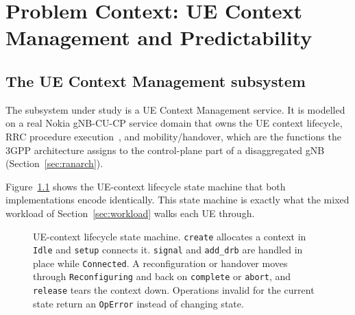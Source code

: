 \documentclass[english,oneside,a4paper,censored,csm,software-track-2020]{HYthesisML}
\begin{document}
\chapter{Problem Context: UE Context Management and Predictability\label{chapter:context}}

\section{The UE Context Management subsystem}\label{sec:uecm}
The subsystem under study is a UE Context Management service. It is modelled on a real Nokia
gNB-CU-CP service domain that owns the UE context lifecycle, RRC procedure
execution~\cite{3gpp38331}, and mobility/handover, which are the functions the 3GPP architecture
assigns to the control-plane part of a disaggregated gNB (Section~\ref{sec:ranarch}).

Figure~\ref{fig:fsm} shows the UE-context lifecycle state machine that both implementations
encode identically. This state machine is exactly what the mixed workload
of Section~\ref{sec:workload} walks each UE through.

\begin{figure}[ht]
\centering
{}
\caption[UE-context lifecycle state machine]{UE-context lifecycle state machine. \texttt{create} allocates a context in
\texttt{Idle} and \texttt{setup} connects it. \texttt{signal} and \texttt{add\_drb} are handled
in place while \texttt{Connected}. A reconfiguration or handover moves through
\texttt{Reconfiguring} and back on \texttt{complete} or \texttt{abort}, and \texttt{release}
tears the context down. Operations invalid for the current state return an \texttt{OpError}
instead of changing state.\label{fig:fsm}}
\end{figure}
\end{document}

